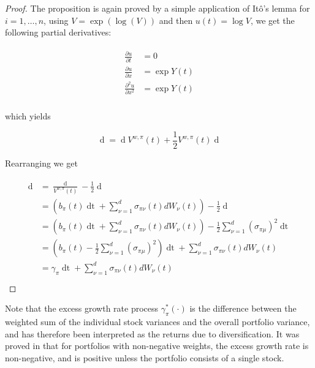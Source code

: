 \documentclass[british]{amsart} \usepackage{lmodern}
\numberwithin{equation}{section} \numberwithin{figure}{section}
\theoremstyle{plain} \newtheorem{thm}{\protect\theoremname}[section]
\theoremstyle{definition} \newtheorem{defn}[thm]{\protect\definitionname}
\theoremstyle{plain} \newtheorem{assumption}[thm]{\protect\assumptionname}
\theoremstyle{plain} \newtheorem{lem}[thm]{\protect\lemmaname}
\theoremstyle{plain} \newtheorem{prop}[thm]{\protect\propositionname}
\theoremstyle{remark} \newtheorem{rem}[thm]{\protect\remarkname}
\theoremstyle{plain} \newtheorem{cor}[thm]{\protect\corollaryname}
\renewcommand{\d}[1]{\mathop{\mathrm{d}{#1}}}
\newcommand{\rangei}{i=1,\dots,n} \newcommand{\measure}{\mathbb{P}}
\newcommand{\V}{V^{w,\pi}}
\begin{document}
\begin{proof}

  The proposition is again proved by a simple application of It\^{o}'s lemma 
  for $\rangei$, using $V = \exp(\log(V))$ and then $u(t) = \log{V}$, we get 
  the following partial derivatives:

  \begin{gather*}
    \begin{split}
      \frac{\partial u}{\partial t} &= 0 \\
      \frac{\partial u}{\partial x} &= \exp{Y(t)}  \\
      \frac{\partial^2 u}{\partial x^2} &= \exp{Y(t)}  \\
    \end{split}
  \end{gather*}

  which yields

  \begin{equation*}
      \d{\V(t)} = \d{\log{\V(t)}} \V(t) 
          + \frac{1}{2} \V(t) \d{ \langle \log{\V} \rangle_{t} } 
  \end{equation*}

  Rearranging we get

  \begin{gather*}
    \begin{split}
      \d{\log{\V(t)}} 
      &= \frac{\d{\V(t)}}{\V(t)} 
          - \frac{1}{2} \d{ \langle \log{\V} \rangle_{t} } \\
      &= \left(
          b_{\pi}(t)\d{t} + 
              \sum_{\nu=1}^{d} \sigma_{\pi\nu}(t) dW_{\nu}(t)
          \right)
          - \frac{1}{2} \d{ \langle \log{\V} \rangle_{t} } \\
      &= \left(
          b_{\pi}(t)\d{t} + 
              \sum_{\nu=1}^{d} \sigma_{\pi\nu}(t) dW_{\nu}(t)
          \right)
          - \frac{1}{2} \sum_{\nu=1}^{d}(\sigma_{\pi\mu})^2\d{t} \\
      &= \left(
              b_{\pi}(t)
              - \frac{1}{2} \sum_{\nu=1}^{d}(\sigma_{\pi\mu})^2 
          \right) \d{t} +
          \sum_{\nu=1}^{d} \sigma_{\pi\nu}(t) dW_{\nu}(t) \\
      &= \gamma_{\pi}\d{t} + \sum_{\nu=1}^{d} \sigma_{\pi\nu}(t) dW_{\nu}(t) \\
    \end{split}
  \end{gather*}

\end{proof}

Note that the excess growth rate process $\gamma_{\pi}^{*}(\cdot)$ is the
difference between the weighted sum of the individual stock variances and the
overall portfolio variance, and has therefore been interpreted as the returns due
to diversification. It was proved in \cite{fernholz1999diversity} that for
portfolios with non-negative weights, the excess growth rate is non-negative,
and is positive unless the portfolio consists of a single stock.
\end{document}
